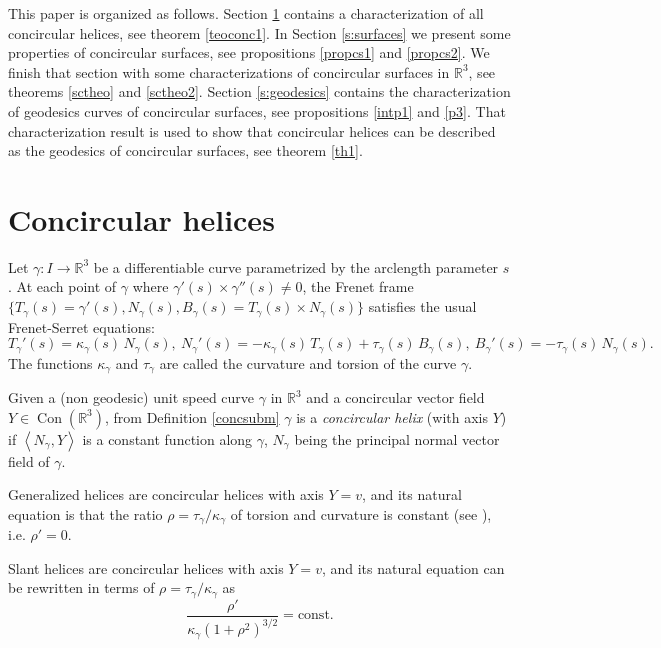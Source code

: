 \documentclass[eqnumis, pdf]{hjms}
\def\R#1{\ensuremath{\mathbb{R}^{#1}}}
\def\<{\left<}
\def\>{\right>}
\DeclareMathOperator{\Con}{Con}
\begin{document}
This paper is organized as follows. Section \ref{s:helices} contains a characterization of all concircular helices, see theorem \ref{teoconc1}. In Section \ref{s:surfaces} we present some properties of concircular surfaces, see propositions \ref{propcs1} and \ref{propcs2}. We finish that section with some characterizations of concircular surfaces in $\R3$, see theorems \ref{sctheo} and \ref{sctheo2}. Section \ref{s:geodesics} contains the characterization of geodesics curves of concircular surfaces, see propositions \ref{intp1} and \ref{p3}. That characterization result is used to show that concircular helices can be described as the geodesics of concircular surfaces, see theorem \ref{th1}.

\section{Concircular helices}
\label{s:helices}

Let $\gamma:I\to\R3$ be a differentiable curve parametrized by the arclength parameter $s$. At each point of $\gamma$ where $\gamma'(s)\times\gamma''(s)\neq0$, the Frenet frame $\{T_\gamma(s)=\gamma'(s),N_\gamma(s),B_\gamma(s)=T_\gamma(s)\times N_\gamma(s)\}$ satisfies the usual Frenet-Serret equations:
\begin{equation}
T_\gamma'(s)=\kappa_\gamma(s)\,N_\gamma(s),\
N_\gamma'(s)=-\kappa_\gamma(s)\,T_\gamma(s)+\tau_\gamma(s)\,B_\gamma(s),\
B_\gamma'(s)=-\tau_\gamma(s)\,N_\gamma(s).\label{FS-eq}
\end{equation}
The functions $\kappa_\gamma$ and $\tau_\gamma$ are called the curvature and torsion of the curve $\gamma$.

Given a (non geodesic) unit speed curve $\gamma$ in $\R{3}$ and a concircular vector field $Y\in\Con(\R{3})$, from Definition \ref{concsubm} $\gamma$ is a \emph{concircular helix} (with axis $Y$) if $\<N_\gamma,Y\>$ is a constant function along $\gamma$, $N_\gamma$ being the principal normal vector field of $\gamma$.

\begin{example}
Generalized helices are concircular helices with axis $Y=v$, and its natural equation is that the ratio $\rho=\tau_\gamma/\kappa_\gamma$ of torsion and curvature is constant (see \cite{Sai46}), i.e. $\rho'=0$.
\end{example}

\begin{example}
Slant helices are concircular helices with axis $Y=v$, and its natural equation can be rewritten in terms of $\rho=\tau_\gamma/\kappa_\gamma$ as
\begin{equation*}
\frac{\rho'}{\kappa_\gamma(1+\rho^2)^{3/2}}=\text{const}.
\end{equation*}
\end{example}
\end{document}
